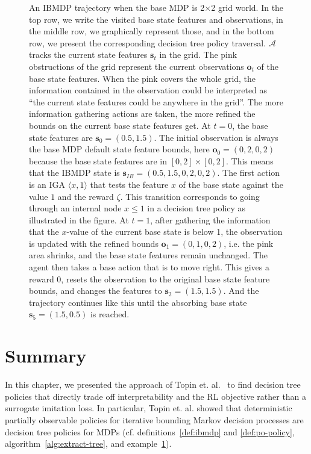 \begin{figure}
\begin{tikzpicture}[scale=0.6]
    
\end{tikzpicture}
\caption{An IBMDP trajectory when the base MDP is 2$\times$2 grid world. In the top row, we write the visited base state features and observations, in the middle row, we graphically represent those, and in the bottom row, we present the corresponding decision tree policy traversal.
$\mathcal{A}$ tracks the current state features $\boldsymbol{s}_t$ in the grid.
The pink obstructions of the grid represent the current observations $\boldsymbol{o}_t$ of the base state features.
When the pink covers the whole grid, the information contained in the observation could be interpreted as ``the current state features could be anywhere in the grid''.
The more information gathering actions are taken, the more refined the bounds on the current base state features get.
At $t=0$, the base state features are $\boldsymbol{s}_0 = (0.5, 1.5)$. 
The initial observation is always the base MDP default state feature bounds, here $\boldsymbol{o}_0=(0, 2, 0, 2)$ because the base state features are in $[0, 2] \times [0, 2]$.
This means that the IBMDP state is $\boldsymbol{s}_{IB} = (0.5, 1.5, 0, 2, 0, 2)$.
The first action is an IGA $\langle x, 1\rangle$ that tests the feature $x$ of the base state against the value $1$ and the reward $\zeta$. 
This transition corresponds to going through an internal node $ x\leq 1$ in a decision tree policy as illustrated in the figure. 
At $t=1$, after gathering the information that the $x$-value of the current base state is below 1, the observation is updated with the refined bounds $\boldsymbol{o}_1=(0, 1, 0, 2)$, i.e. the pink area shrinks, and the base state features remain unchanged.
The agent then takes a base action that is to move right. 
This gives a reward 0, resets the observation to the original base state feature bounds, and changes the features to $\boldsymbol{s}_2=(1.5, 1.5)$. And the trajectory continues like this until the absorbing base state $\boldsymbol{s}_5=(1.5, 0.5)$ is reached.}
\label{example:ibmdp}
\end{figure}

\section{Summary}
In this chapter, we presented the approach of Topin et. al.~\cite{topin2021iterative} to find decision tree policies that directly trade off interpretability and the RL objective rather than a surrogate imitation loss.
In particular, Topin et. al. showed that deterministic partially observable policies for iterative bounding Markov decision processes are decision tree policies for MDPs (cf. definitions~\ref{def:ibmdp} and \ref{def:po-policy}, algorithm~\ref{alg:extract-tree}, and example~\ref{example:ibmdp}).

